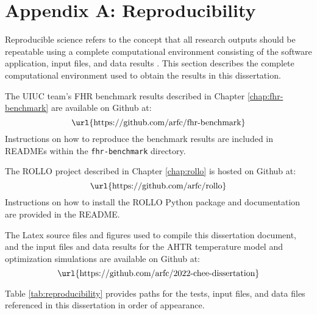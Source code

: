 \chapter{Appendix A: Reproducibility} 

Reproducible science refers to the concept that all research outputs should be 
repeatable using a complete computational environment consisting of the software 
application, input files, and data results \cite{novak_multiscale_2020}.
This section describes the complete computational environment used to obtain the 
results in this dissertation.

The UIUC team's \gls{FHR} benchmark results described in Chapter \ref{chap:fhr-benchmark} 
are available on Github at: 
\begin{equation*}
\mbox{\url{https://github.com/arfc/fhr-benchmark}}
\end{equation*}
Instructions on how to reproduce the benchmark results are included in READMEs within 
the \texttt{fhr-benchmark} directory. 

The \gls{ROLLO} project described in Chapter \ref{chap:rollo} is hosted on Github at: 
\begin{equation*}
    \mbox{\url{https://github.com/arfc/rollo}}
\end{equation*}
Instructions on how to install the \gls{ROLLO} Python package and documentation are 
provided in the README. 

The Latex source files and figures used to compile this dissertation document, and 
the input files and data results for the AHTR temperature model and optimization 
simulations are available on Github at:  
\begin{equation*}
    \mbox{\url{https://github.com/arfc/2022-chee-dissertation}}
\end{equation*}

Table \ref{tab:reproducibility} provides paths for the tests, input files, and data 
files referenced in this dissertation in order of appearance. 

